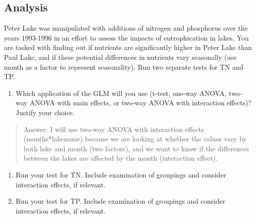 \documentclass[
]{article}
\newenvironment{Shaded}{\begin{snugshade}}{\end{snugshade}}
\newcommand{\CommentTok}[1]{\textcolor[rgb]{0.56,0.35,0.01}{\textit{#1}}}
\newcommand{\DecValTok}[1]{\textcolor[rgb]{0.00,0.00,0.81}{#1}}
\newcommand{\FloatTok}[1]{\textcolor[rgb]{0.00,0.00,0.81}{#1}}
\newcommand{\KeywordTok}[1]{\textcolor[rgb]{0.13,0.29,0.53}{\textbf{#1}}}
\newcommand{\NormalTok}[1]{#1}
\newcommand{\OperatorTok}[1]{\textcolor[rgb]{0.81,0.36,0.00}{\textbf{#1}}}
\newcommand{\StringTok}[1]{\textcolor[rgb]{0.31,0.60,0.02}{#1}}
\providecommand{\tightlist}{%
  \setlength{\itemsep}{0pt}\setlength{\parskip}{0pt}}
\begin{document}
\begin{Shaded}
\end{Shaded}

\hypertarget{analysis}{%
\subsection{Analysis}\label{analysis}}

Peter Lake was manipulated with additions of nitrogen and phosphorus
over the years 1993-1996 in an effort to assess the impacts of
eutrophication in lakes. You are tasked with finding out if nutrients
are significantly higher in Peter Lake than Paul Lake, and if these
potential differences in nutrients vary seasonally (use month as a
factor to represent seasonality). Run two separate tests for TN and TP.

\begin{enumerate}
\def\labelenumi{\arabic{enumi}.}
\setcounter{enumi}{3}
\tightlist
\item
  Which application of the GLM will you use (t-test, one-way ANOVA,
  two-way ANOVA with main effects, or two-way ANOVA with interaction
  effects)? Justify your choice.
\end{enumerate}

\begin{quote}
Answer: I will use two-way ANOVA with interaction effects
(months*lakename) because we are looking at whether the values vary by
both lake and month (two factors), and we want to know if the
differences between the lakes are affected by the month (interaction
effect).
\end{quote}

\begin{enumerate}
\def\labelenumi{\arabic{enumi}.}
\setcounter{enumi}{4}
\item
  Run your test for TN. Include examination of groupings and consider
  interaction effects, if relevant.
\item
  Run your test for TP. Include examination of groupings and consider
  interaction effects, if relevant.
\end{enumerate}
\end{document}
